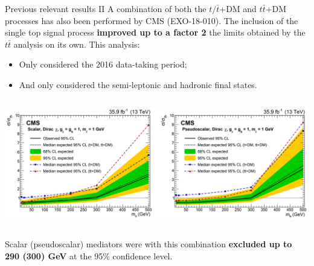 \documentclass[8pt]{beamer}
\begin{document}
\begin{frame}{Previous relevant results II}
\justifying
\vspace{5pt}
A \alert{combination of both the $t/ \bar t$+DM and $t \bar t$+DM processes} has also been performed by CMS (EXO-18-010). The inclusion of the single top signal process \textbf{improved up to a factor 2} the limits obtained by the $t \bar t$ analysis on its own. This analysis: %

\begin{itemize}
\item Only considered the 2016 data-taking period;
\item And only considered the semi-leptonic and hadronic final states.
\end{itemize} \vfill

\begin{center}
\begin{columns}
	\begin{column}{1.0\textwidth}
		\begin{center}
			\includegraphics[width=1.0\textwidth]{figs/limitsprevious.png}
    		 \end{center}
	\end{column} \hfill
\end{columns}
\end{center} \vfill

Scalar (pseudoscalar) mediators were with this combination \textbf{excluded up to 290 (300) GeV} at the 95\% confidence level. \vfill %
\end{frame}
\end{document}
